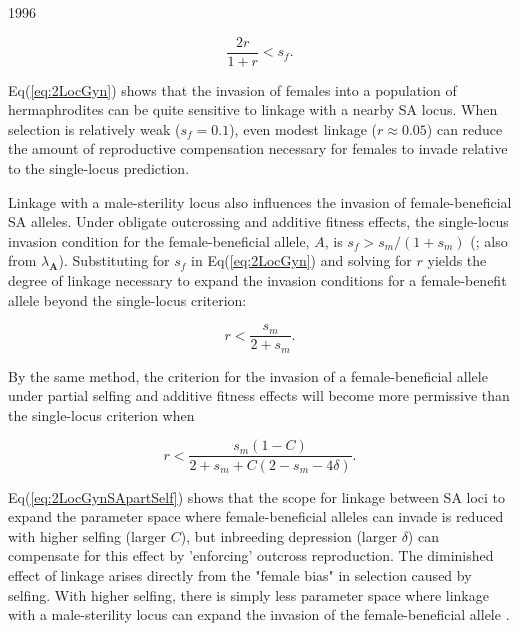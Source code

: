 1996\documentclass[9pt,twocolumn,twoside,lineno]{gsajnl}
\begin{document}
\begin{equation}\label{eq:2LocGyn}
	\frac{2 r}{1 + r} < s_f.
\end{equation}

\noindent Eq(\ref{eq:2LocGyn}) shows that the invasion of females into a population of hermaphrodites can be quite sensitive to linkage with a nearby SA locus. When selection is relatively weak ($s_f = 0.1$), even modest linkage ($r\approx0.05$) can reduce the amount of reproductive compensation necessary for females to invade relative to the single-locus prediction. 

Linkage with a male-sterility locus also influences the invasion of female-beneficial SA alleles. Under obligate outcrossing and additive fitness effects, the single-locus invasion condition for the female-beneficial allele, $A$, is $s_f > s_m / (1+s_m)$ (\citealt{Kidwell1977}; also from $\lambda_{\mathbf{A}}$). Substituting for $s_f$ in Eq(\ref{eq:2LocGyn}) and solving for $r$ yields the degree of linkage necessary to expand the invasion conditions for a female-benefit allele beyond the single-locus criterion:

\begin{equation}\label{eq:2LocGynSA}
	r < \frac{s_m}{2 + s_m}.
\end{equation}

\noindent By the same method, the criterion for the invasion of a female-beneficial allele under partial selfing and additive fitness effects will become more permissive than the single-locus criterion when

\begin{equation}\label{eq:2LocGynSApartSelf}
	r < \frac{s_m (1 - C)}{2 + s_m +C (2 - s_m - 4 \delta)}.
\end{equation}

\noindent Eq(\ref{eq:2LocGynSApartSelf}) shows that the scope for linkage between SA loci to expand the parameter space where female-beneficial alleles can invade is reduced with higher selfing (larger $C$), but inbreeding depression (larger $\delta$) can compensate for this effect by 'enforcing' outcross reproduction. The diminished effect of linkage arises directly from the "female bias" in selection caused by selfing. With higher selfing, there is simply less parameter space where linkage with a male-sterility locus can expand the invasion of the female-beneficial allele \citep{JordanConnallon2014,Olito2016}.


\end{document}
